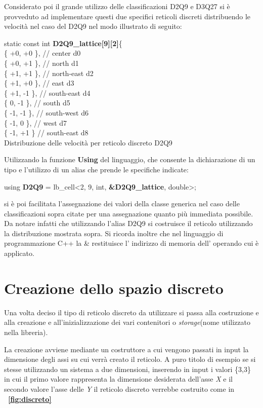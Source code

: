{Considerato poi il grande utilizzo delle classificazioni D2Q9 e D3Q27 si \`e provveduto ad implementare questi due specifici reticoli discreti distribuendo le velocit\`a nel caso del D2Q9 nel modo illustrato di seguito: 
\begin{center}
		\centering
	static const int \textbf{D2Q9\_lattice[9][2]}\{ \\
		\{ +0, +0 \},     // center d0 \\
		\{ +0, +1 \},     // north d1 \\
		\{ +1, +1 \},     // north-east d2\\
		\{ +1, +0 \},     // east d3\\
		\{ +1, -1 \},     // south-east d4\\
		\{  0, -1 \},      // south d5\\
		\{ -1, -1 \},     // south-west d6\\
		\{ -1,  0 \},     // west d7\\
		\{ -1, +1 \}      // south-east d8\\
	Distribuzione delle velocit\`a per reticolo discreto D2Q9
\end{center}
\vspace{0.5 cm}
Utilizzando la funzione \textbf{Using} del linguaggio, che consente la dichiarazione di un tipo e l'utilizzo di un alias che prende le specifiche indicate:
\begin{center}
	\centering
    using \textbf{D2Q9}  = lb\_cell<2,  9, int, \textbf{\&D2Q9\_lattice},  double>;
\end{center}
si \`e poi facilitata l'assegnazione dei valori della classe generica nel caso delle classificazioni sopra citate per una assegnazione quanto pi\`u immediata possibile. Da notare infatti che utilizzando l'alias D2Q9 si costruisce il reticolo utilizzando la distribuzione mostrata sopra. Si ricorda inoltre che nel linguaggio di programmazione C++ la \& restituisce l' indirizzo di memoria dell' operando cui \`e applicato.

\section{Creazione dello spazio discreto}
Una volta deciso il tipo di reticolo discreto da utilizzare si passa alla costruzione e alla creazione e all'inizializzazione dei vari contenitori o \textit{storage}(nome utilizzato nella libreria).

La creazione avviene mediante un costruttore a cui vengono passati in input la dimensione degli assi su cui verr\`a creato il reticolo. A puro titolo di esempio se si stesse utilizzando un sistema a due dimensioni, inserendo in input i valori \{3,3\}  in cui il primo valore rappresenta la dimensione desiderata dell'asse \textit{X} e il secondo valore l'asse delle \textit{Y} il reticolo discreto verrebbe costruito come in \textbf{\figurename~\ref{fig:discreto}} 

}
